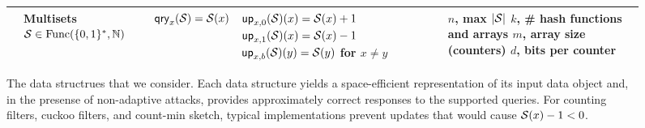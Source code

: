 \begin{figure*}[tp]
\begin{center}
\begin{tabular}{ |p{1.75cm} | p{2.5cm} | p{2.95cm} | p{4cm} | p{3.7cm}|}
          & \parbox[c]{2.5cm}{Multisets\\ $\mathcal{S} \in \mathrm{Func}(\{0,1\}^*,\mathbb{N})$}
          & $\mathsf{qry}_x(\mathcal{S}) = \mathcal{S}(x)$
          & \parbox[c][10ex]{4cm}{$\mathsf{up}_{x,0}(\mathcal{S})(x) = \mathcal{S}(x)+1$ \\ $\mathsf{up}_{x,1}(\mathcal{S})(x) = \mathcal{S}(x)-1$ \\ $\mathsf{up}_{x,b}(\mathcal{S})(y) = \mathcal{S}(y)$ for $x \neq y$}
          & \parbox[c]{3.75cm}{$n$, max $|\mathcal{S}|$\\$k$, \# hash functions and arrays\\$m$, array size (counters)\\$d$, bits per counter}
          \\ \hline
  \end{tabular}
\caption{The data structrues that we consider. Each data structure yields a
space-efficient representation of its input data object and, in the presense of
non-adaptive attacks, provides approximately correct responses to the supported
queries.  For counting filters, cuckoo filters, and count-min sketch, typical
implementations prevent updates that would cause $\mathcal{S}(x)-1 < 0$.}
  \label{fig:structures-summary}
\end{center}
\end{figure*}
